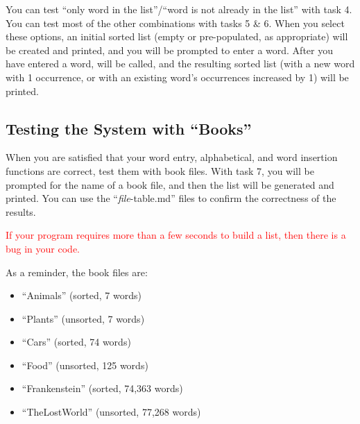 You can test ``only word in the list''/``word is not already in the list'' with task 4.
You can test most of the other combinations with tasks 5 \& 6.
When you select these options, an initial sorted list (empty or pre-populated, as appropriate) will be created and printed, and you will be prompted to enter a word.
After you have entered a word,  will be called, and the resulting sorted list (with a new word with 1 occurrence, or with an existing word's occurrences increased by 1) will be printed.

\begin{description}
\end{description}


\subsection{Testing the System with ``Books''} \label{subsec:TestingChallengeResponse}

When you are satisfied that your word entry, alphabetical, and word insertion functions are correct, test them with book files.
With task 7, you will be prompted for the name of a book file, and then the list will be generated and printed.
You can use the ``\textit{file}-table.md'' files to confirm the correctness of the results.

\textcolor{red}{If your program requires more than a few seconds to build a list, then there is a bug in your code.}

\begin{description}
\end{description}

As a reminder, the book files are:

\begin{itemize}
    \item ``Animals'' (sorted, 7 words)
    \item ``Plants'' (unsorted, 7 words)
    \item ``Cars'' (sorted, 74 words)
    \item ``Food'' (unsorted, 125 words)
    \item ``Frankenstein'' (sorted, 74,363 words)
    \item ``TheLostWorld'' (unsorted, 77,268 words)
\end{itemize}


